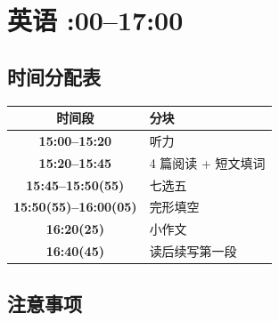 \chapter{英语 :00--17:00}

\section{时间分配表}

\begin{center}
\begin{tabular}{@{} >{\bfseries}c l @{}}
    \toprule
    时间段 & 分块 \\
    \midrule
    15:00--15:20 & 听力 \\
    15:20--15:45 & 4 篇阅读 + 短文填词 \\
    15:45--15:50(55) & 七选五 \\
    15:50(55)--16:00(05) & 完形填空 \\
    16:20(25) & 小作文 \\
    16:40(45) & 读后续写第一段 \\
    \bottomrule
\end{tabular}
\end{center}

\section{注意事项}

